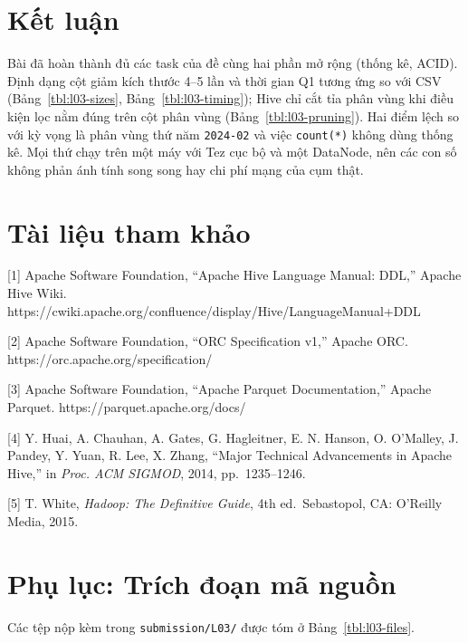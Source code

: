 \documentclass[
  12pt,
  a4paper,
]{report}
\begin{document}
\section{Kết luận}\label{sec:l03-conclusion}

Bài đã hoàn thành đủ các task của đề cùng hai phần mở rộng (thống kê,
ACID). Định dạng cột giảm kích thước 4--5 lần và thời gian Q1 tương ứng
so với CSV (Bảng~\ref{tbl:l03-sizes}, Bảng~\ref{tbl:l03-timing}); Hive
chỉ cắt tỉa phân vùng khi điều kiện lọc nằm đúng trên cột phân vùng
(Bảng~\ref{tbl:l03-pruning}). Hai điểm lệch so với kỳ vọng là phân vùng
thứ năm \texttt{2024-02} và việc \texttt{count(*)} không dùng thống kê.
Mọi thứ chạy trên một máy với Tez cục bộ và một DataNode, nên các con số
không phản ánh tính song song hay chi phí mạng của cụm thật.

\section*{Tài liệu tham khảo}\label{tuxe0i-liux1ec7u-tham-khux1ea3o-2}

{[}1{]} Apache Software Foundation, ``Apache Hive Language Manual:
DDL,'' Apache Hive Wiki.
https://cwiki.apache.org/confluence/display/Hive/LanguageManual+DDL

{[}2{]} Apache Software Foundation, ``ORC Specification v1,'' Apache
ORC. https://orc.apache.org/specification/

{[}3{]} Apache Software Foundation, ``Apache Parquet Documentation,''
Apache Parquet. https://parquet.apache.org/docs/

{[}4{]} Y. Huai, A. Chauhan, A. Gates, G. Hagleitner, E. N. Hanson, O.
O'Malley, J. Pandey, Y. Yuan, R. Lee, X. Zhang, ``Major Technical
Advancements in Apache Hive,'' in \emph{Proc. ACM SIGMOD}, 2014,
pp.~1235--1246.

{[}5{]} T. White, \emph{Hadoop: The Definitive Guide}, 4th
ed.~Sebastopol, CA: O'Reilly Media, 2015.

\section*{Phụ lục: Trích đoạn mã
nguồn}\label{phux1ee5-lux1ee5c-truxedch-ux111oux1ea1n-muxe3-nguux1ed3n-1}

Các tệp nộp kèm trong \texttt{submission/L03/} được tóm ở
Bảng~\ref{tbl:l03-files}.
\end{document}
